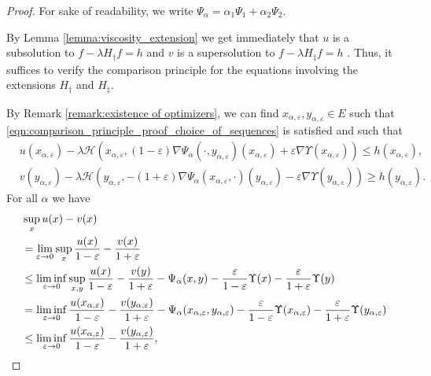 \documentclass[a4paper]{article}
\newcommand{\cH}{\mathcal{H}}
\numberwithin{equation}{section}
\theoremstyle{definition}
\begin{document}
\begin{proof}
	For sake of readability, we write $\Psi_\alpha = \alpha_1 \Psi_1 + \alpha_2 \Psi_2$.
	
	
	By Lemma \ref{lemma:viscosity_extension} we get immediately that $u$ is a subsolution to $f - \lambda H_\dagger f = h$ and $v$ is a supersolution to $f - \lambda H_\ddagger f = h$ . Thus, it suffices to verify the comparison principle for the equations involving the extensions $H_\dagger$ and $H_\ddagger$.
	
	\smallskip
	
	By Remark \ref{remark:existence of optimizers}, we can find $x_{\alpha,\varepsilon},y_{\alpha,\varepsilon} \in E$ such that  \eqref{eqn:comparison_principle_proof_choice_of_sequences} is satisfied and such that
	\begin{align}
		& u(x_{\alpha,\varepsilon}) - \lambda \cH\left(x_{\alpha,\varepsilon}, (1-\varepsilon)\nabla \Psi_\alpha(\cdot,y_{\alpha,\varepsilon})(x_{\alpha,\varepsilon}) + \varepsilon \nabla \Upsilon(x_{\alpha,\varepsilon})\right) \leq h(x_{\alpha,\varepsilon}), \label{eqn:ineq_comp_proof_1}\\
		& v(y_{\alpha,\varepsilon}) - \lambda \cH\left(y_{\alpha,\varepsilon},-(1+\varepsilon)\nabla \Psi_\alpha(x_{\alpha,\varepsilon},\cdot)(y_{\alpha,\varepsilon}) - \varepsilon \nabla \Upsilon(y_{\alpha,\varepsilon})\right) \geq h(y_{\alpha,\varepsilon}).\label{eqn:ineq_comp_proof_2}
	\end{align}
	For all $\alpha$ we have
	\begin{align}
		& \sup_x u(x) - v(x) \notag\\
		& = \lim_{\varepsilon \rightarrow 0} \sup_x \frac{u(x)}{1-\varepsilon} - \frac{v(x)}{1+\varepsilon} \notag\\
		& \leq \liminf_{\varepsilon \rightarrow 0} \sup_{x,y} \frac{u(x)}{1-\varepsilon} - \frac{v(y)}{1+\varepsilon} -  \Psi_\alpha(x,y) - \frac{\varepsilon}{1-\varepsilon} \Upsilon(x) - \frac{\varepsilon}{1+\varepsilon}\Upsilon(y) \notag\\
		& = \liminf_{\varepsilon \rightarrow 0} \frac{u(x_{\alpha,\varepsilon})}{1-\varepsilon} - \frac{v(y_{\alpha,\varepsilon})}{1+\varepsilon} - \Psi_\alpha(x_{\alpha,\varepsilon},y_{\alpha,\varepsilon}) - \frac{\varepsilon}{1-\varepsilon}\Upsilon(x_{\alpha,\varepsilon}) -\frac{\varepsilon}{1+\varepsilon}\Upsilon(y_{\alpha,\varepsilon}) \notag \\
		& \leq \liminf_{\varepsilon \rightarrow 0} \frac{u(x_{\alpha,\varepsilon})}{1-\varepsilon} - \frac{v(y_{\alpha,\varepsilon})}{1+\varepsilon}, \label{eqn:basic_inequality_on_sub_super_sol}

\end{align}
\end{proof}
\end{document}
